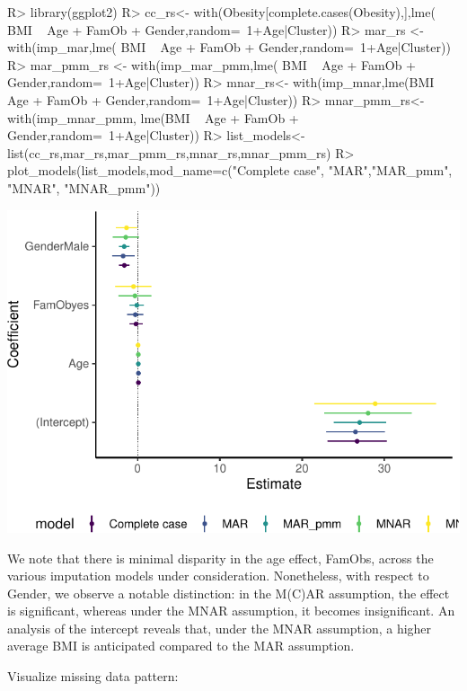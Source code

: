 \documentclass[
]{jss}
\begin{document}
\begin{CodeChunk}
\begin{CodeInput}
R> library(ggplot2)
R> cc_rs<- with(Obesity[complete.cases(Obesity),],lme( BMI ~ Age + FamOb + Gender,random=~1+Age|Cluster))
R> mar_rs <- with(imp_mar,lme( BMI ~ Age + FamOb + Gender,random=~1+Age|Cluster))
R> mar_pmm_rs <- with(imp_mar_pmm,lme( BMI ~ Age + FamOb + Gender,random=~1+Age|Cluster))
R> mnar_rs<- with(imp_mnar,lme(BMI ~ Age + FamOb + Gender,random=~1+Age|Cluster))
R> mnar_pmm_rs<- with(imp_mnar_pmm, lme(BMI ~ Age + FamOb + Gender,random=~1+Age|Cluster))
R> list_models<-list(cc_rs,mar_rs,mar_pmm_rs,mnar_rs,mnar_pmm_rs)
R> plot_models(list_models,mod_name=c("Complete case", "MAR","MAR_pmm", "MNAR", "MNAR_pmm"))
\end{CodeInput}


\begin{center}\includegraphics{Imputation_of_Incomplete_Multilevel_Data_files/figure-latex/models-1} \end{center}

\end{CodeChunk}

We note that there is minimal disparity in the age effect, FamObs,
across the various imputation models under consideration. Nonetheless,
with respect to Gender, we observe a notable distinction: in the M(C)AR
assumption, the effect is significant, whereas under the MNAR
assumption, it becomes insignificant. An analysis of the intercept
reveals that, under the MNAR assumption, a higher average BMI is
anticipated compared to the MAR assumption.

Visualize missing data pattern:
\end{document}
